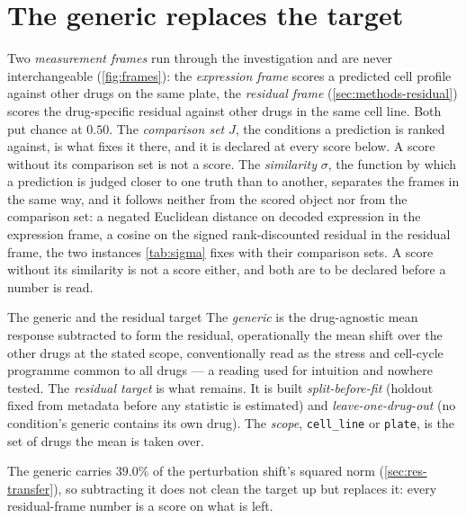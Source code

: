 \section{The generic replaces the target}
\label{sec:apparatus-vocab}

Two \emph{measurement frames} run through the investigation and are never
interchangeable (\cref{fig:frames}): the \emph{expression frame} scores a
predicted cell profile against other drugs on the same plate, the
\emph{residual frame} (\cref{sec:methods-residual}) scores the drug-specific
residual against other drugs in the same cell line. Both put chance at $0.50$. The
\emph{comparison set} $J$, the conditions a prediction is ranked against, is
what fixes it there, and it is declared at every score below. A score without
its comparison set is not a score. The \emph{similarity} $\sigma$, the function
by which a prediction is judged closer to one truth than to another, separates
the frames in the same way, and it follows neither from the scored object nor
from the comparison set: a negated Euclidean distance on decoded expression in
the expression frame, a cosine on the signed rank-discounted residual in the
residual frame, the two instances \cref{tab:sigma} fixes with their comparison
sets. A score without its similarity is not a score either, and both are to be
declared before a number is read.



\begin{defn}{The generic and the residual target}
The \emph{generic} is the drug-agnostic mean response subtracted to form the
residual, operationally the mean shift over the other drugs at the stated scope,
conventionally read as the stress and cell-cycle programme common to all
drugs --- a reading used for intuition and nowhere tested. The
\emph{residual target} is what remains. It is built \emph{split-before-fit}
(holdout fixed from metadata before any statistic is estimated) and
\emph{leave-one-drug-out} (no condition's generic contains its own drug). The \emph{scope}, \texttt{cell\_line} or \texttt{plate}, is the set
of drugs the mean is taken over.
\end{defn}

The generic carries $39.0\%$ of the perturbation shift's squared norm
(\cref{sec:res-transfer}), so subtracting it does not clean the target up but
replaces it: every residual-frame number is a score on what is left.

